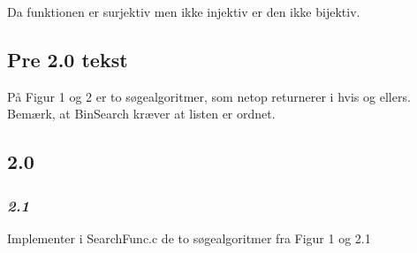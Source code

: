 \documentclass{article}
\begin{document}
\begin{Maple Normal}{
}\end{Maple Normal}
\begin{Maple Normal}{
}\end{Maple Normal}
\begin{Maple Normal}{
}\end{Maple Normal}
\begin{Maple Normal}{
}\end{Maple Normal}
\begin{Maple Normal}{
}\end{Maple Normal}
\begin{Maple Normal}{
Da funktionen er surjektiv men ikke injektiv er den ikke bijektiv.
}\end{Maple Normal}

\subsection{\textbf{Pre 2.0 tekst}}
\begin{Maple Normal}{
På Figur 1 og 2 er to søgealgoritmer, som netop returnerer i hvis 
 og ellers. Bemærk, at BinSearch kræver at listen er ordnet.}\end{Maple Normal}

\subsection{\textbf{2.0}}
\begin{Maple Normal}{
}\end{Maple Normal}
\subsubsection{\textbf{\textit{2.1}}}
\begin{Maple Normal}{
Implementer i SearchFunc.c de to søgealgoritmer fra Figur 1 og 2.1\linebreak
}\end{Maple Normal}

\begin{Maple Normal}{
}\end{Maple Normal}
\end{document}
